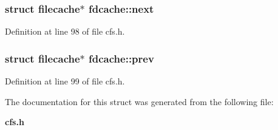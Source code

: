 \subsubsection{\setlength{\rightskip}{0pt plus 5cm}struct filecache$\ast$ {\bf fdcache::next}}\label{structfdcache_o3}




Definition at line 98 of file cfs.h.
\subsubsection{\setlength{\rightskip}{0pt plus 5cm}struct filecache$\ast$ {\bf fdcache::prev}}\label{structfdcache_o4}




Definition at line 99 of file cfs.h.

The documentation for this struct was generated from the following file:\begin{CompactItemize}
\item 
{\bf cfs.h}\end{CompactItemize}
